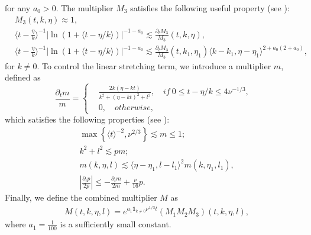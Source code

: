 \documentclass[12pt]{article}
\numberwithin{equation}{section}
\begin{document}
    \color{black}
	for any $a_0>0$. The multiplier $M_3$ satisfies the following useful property (see \cite{LSWZ25}):
	\begin{equation}\label{prop-m3}
	     \begin{aligned}
		&M_3(t,k,\eta)\approx1,\\
        & \langle t-\frac{\eta}{k}\rangle^{-1}|\ln(1+\langle t-\eta/k\rangle)|^{-1-a_0} \lesssim \frac{ \partial_t M_3}{M_3} (t,k,\eta),\\
        & \langle t-\frac{\eta}{k}\rangle^{-1}|\ln(1+\langle t-\eta/k\rangle)|^{-1-a_0} \lesssim \frac{ \partial_t M_3}{M_3} (t,k_1,\eta_1) \langle k-k_1, \eta-\eta_1 \rangle ^{2+a_0(2+a_0)},
	\end{aligned}
	\end{equation}
	for $k\neq 0$.
    To control the linear stretching term, we introduce a multiplier $m$, defined as
	\begin{equation*}
		\frac{\partial_t m}{m}=\left\{\begin{aligned}
			&\frac{2k(\eta-kt)}{k^2+(\eta-kt)^2+l^2},\quad if\ 0\leq t-\eta/k\leq4\nu^{-1/3},\\
			&0,\quad otherwise,
		\end{aligned}\right.
	\end{equation*}
	which satisfies the following properties (see \cite{BGM17}):
	\begin{subequations}\label{propm}
			\begin{align}
			&\max\left\{\langle t\rangle^{-2},\nu^{2/3}\right\}\lesssim m\leq 1;\label{prop1m}\\
			& k^2+l^2\lesssim p m;\label{prop2m}\\
			& m(k,\eta,l)\lesssim \langle\eta-\eta_1,l-l_1\rangle^2m(k,\eta_1,l_1),\label{prop3m} \\
            & \left|\frac{\partial_t p}{2p}\right| \leqslant -\frac{\partial_t m}{2m} + \frac{\nu}{16} p. 
		\end{align}
    \end{subequations}
    Finally, we define the combined multiplier $M$ as
	\begin{align*}
		&M(t,k,\eta,l)=
			e^{a_1\mathbf{1}_{k\neq0}\nu^{1/3}t}(M_1M_2M_3)(t,k,\eta,l),
	\end{align*}
	where $a_1=\frac{1}{100}$ is a sufficiently small constant.
\end{document}
